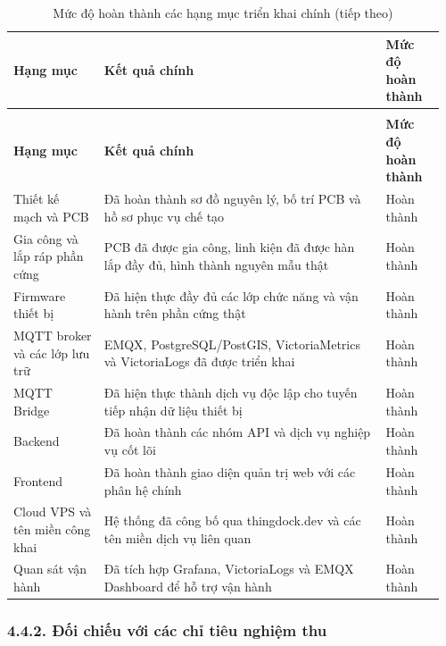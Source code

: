 \documentclass[a4paper]{extarticle}
\newcommand{\thesisterm}[1]{{\rmfamily #1}}
\newcommand{\thesissettableid}[2]{%
  \renewcommand{\thetable}{#1}%
  \renewcommand{\theHtable}{#2}%
}
\begin{document}
{\thesissettableid{4.14}{condensed-bang-4-14-muc-do-hoan-thanh-cac-hang-muc-trien-khai-chinh}
\def\LTcaptype{table}
\begin{longtable}{|L{0.207\linewidth}|L{0.621\linewidth}|L{0.13\linewidth}|}
\caption{Mức độ hoàn thành các hạng mục triển khai chính}\label{tab:condensed-bang-4-14-muc-do-hoan-thanh-cac-hang-muc-trien-khai-chinh}\\
\hline
\textbf{Hạng mục} & \textbf{Kết quả chính} & \textbf{Mức độ hoàn thành} \\
\hline
\endfirsthead
\caption[]{Mức độ hoàn thành các hạng mục triển khai chính (tiếp theo)}\\
\hline
\textbf{Hạng mục} & \textbf{Kết quả chính} & \textbf{Mức độ hoàn thành} \\
\hline
\endhead
\endfoot
\endlastfoot
Thiết kế mạch và PCB & Đã hoàn thành sơ đồ nguyên lý, bố trí PCB và hồ sơ phục vụ chế tạo & Hoàn thành \\\hline
Gia công và lắp ráp phần cứng & PCB đã được gia công, linh kiện đã được hàn lắp đầy đủ, hình thành nguyên mẫu thật & Hoàn thành \\\hline
Firmware thiết bị & Đã hiện thực đầy đủ các lớp chức năng và vận hành trên phần cứng thật & Hoàn thành \\\hline
MQTT broker và các lớp lưu trữ & EMQX, PostgreSQL/PostGIS, VictoriaMetrics và VictoriaLogs đã được triển khai & Hoàn thành \\\hline
MQTT Bridge & Đã hiện thực thành dịch vụ độc lập cho tuyến tiếp nhận dữ liệu thiết bị & Hoàn thành \\\hline
Backend & Đã hoàn thành các nhóm API và dịch vụ nghiệp vụ cốt lõi & Hoàn thành \\\hline
Frontend & Đã hoàn thành giao diện quản trị web với các phân hệ chính & Hoàn thành \\\hline
Cloud VPS và tên miền công khai & Hệ thống đã công bố qua \thesisterm{thingdock.dev} và các tên miền dịch vụ liên quan & Hoàn thành \\\hline
Quan sát vận hành & Đã tích hợp Grafana, VictoriaLogs và EMQX Dashboard để hỗ trợ vận hành & Hoàn thành \\\hline
\end{longtable}
}

\subsubsection{4.4.2. Đối chiếu với các chỉ tiêu nghiệm thu}\label{ux111ux1ed1i-chiux1ebfu-vux1edbi-cuxe1c-chux1ec9-tiuxeau-nghiux1ec7m-thu}
\end{document}
